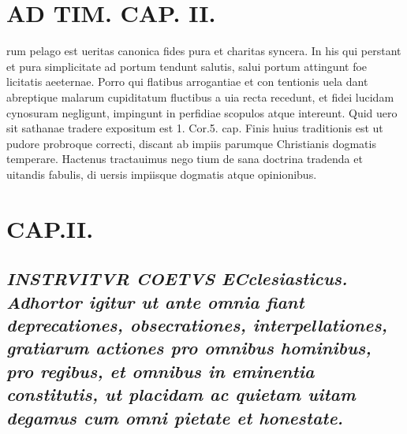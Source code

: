 \documentclass{article}
\begin{document}
\begin{pages}
\section*{AD TIM. CAP. II. }
\marginpar{[ p.108 ]}\pstart rum pelago est ueritas canonica fides pura et charitas syncera. In his qui perstant et pura simplicitate ad portum tendunt salutis, salui portum attingunt foe licitatis aeeternae. Porro qui flatibus arrogantiae et con tentionis uela dant abreptique malarum cupiditatum fluctibus a uia recta recedunt, et fidei lucidam cynosuram negligunt, impingunt in perfidiae scopulos atque  intereunt. Quid uero sit sathanae tradere expositum est 1. Cor.5. cap. Finis huius traditionis est ut pudore probroque correcti, discant ab impiis parumque Christianis dogmatis temperare. Hactenus tractauimus nego tium de sana doctrina tradenda et uitandis fabulis, di uersis impiisque dogmatis atque opinionibus.  \pend
\endnumbering\beginnumbering\section{CAP.II.}
{}
\subsection*{\textit{INSTRVITVR COETVS ECclesiasticus. Adhortor igitur ut ante omnia fiant deprecationes, obsecrationes, interpellationes, gratiarum actiones pro omnibus hominibus, pro regibus, et omnibus in eminentia constitutis, ut placidam ac quietam uitam degamus cum omni pietate et honestate. }}

\end{pages}
\end{document}
